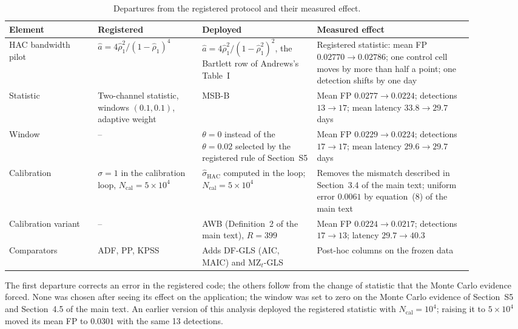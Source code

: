 \documentclass[11pt]{article}
\newcommand{\hacsig}{\hat{\sigma}_{\mathrm{HAC}}}
\newcommand{\ncal}{N_{\mathrm{cal}}}
\newcommand{\RMGLS}{MSB-B}
\begin{document}
\begin{table}[t]
\centering
\caption{Departures from the registered protocol and their measured
effect.}
\label{tab:deviations}
\begin{threeparttable}
\footnotesize
\begin{tabular}{p{0.17\linewidth}p{0.20\linewidth}p{0.22\linewidth}p{0.30\linewidth}}
\toprule
Element & Registered & Deployed & Measured effect \\
\midrule
HAC bandwidth pilot & $\hat a = 4\hat\rho_1^2/(1-\hat\rho_1)^4$ &
  $\hat a = 4\hat\rho_1^2/(1-\hat\rho_1^2)^2$, the Bartlett row of
  Andrews's Table~I & Registered statistic: mean FP $0.02770 \to
  0.02786$; one control cell moves by more than half a point; one
  detection shifts by one day \\
\addlinespace
Statistic & Two-channel statistic, windows $(0.1, 0.1)$, adaptive
  weight & \RMGLS{} & Mean FP $0.0277 \to 0.0224$;
  detections $13 \to 17$; mean latency $33.8 \to 29.7$ days \\
\addlinespace
Window & -- & $\theta = 0$ instead of the $\theta = 0.02$ selected by the
  registered rule of Section~S5 & Mean FP $0.0229 \to 0.0224$;
  detections $17 \to 17$; mean latency $29.6 \to 29.7$ days \\
\addlinespace
Calibration & $\sigma = 1$ in the calibration loop, $\ncal = 5\times
  10^4$ & $\hacsig$ computed in the loop; $\ncal = 5\times10^4$ &
  Removes the mismatch described in Section~3.4 of the main text; uniform error
  $0.0061$ by equation~(8) of the main text \\
\addlinespace
Calibration variant & -- & AWB (Definition~2 of the main text), $R = 399$ & Mean FP
  $0.0224 \to 0.0217$; detections $17 \to 13$; latency $29.7 \to 40.3$ \\
\addlinespace
Comparators & ADF, PP, KPSS & Adds DF-GLS (AIC, MAIC) and MZ$_t$-GLS &
  Post-hoc columns on the frozen data \\
\bottomrule
\end{tabular}
\begin{tablenotes}\footnotesize
\item The first departure corrects an error in the registered code; the
others follow from the change of statistic that the Monte Carlo evidence
forced. None was chosen after seeing its effect on the application; the
window was set to zero on the Monte Carlo evidence of Section~S5
and Section~4.5 of the main text. An
earlier version of this analysis deployed the registered statistic with
$\ncal = 10^4$; raising it to $5\times10^4$ moved its mean FP to
$0.0301$ with the same 13 detections.
\end{tablenotes}
\end{threeparttable}
\end{table}
\end{document}
